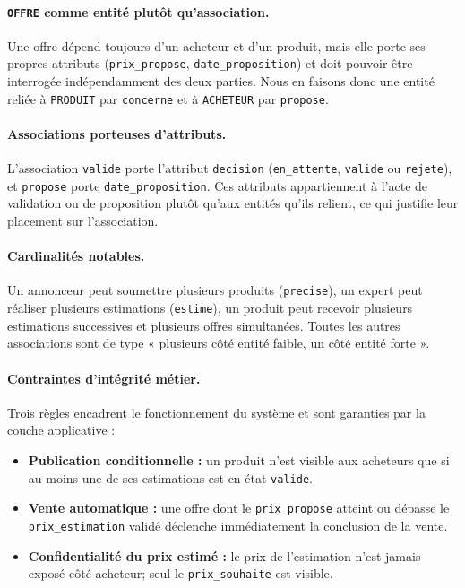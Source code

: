 \documentclass{article}
\theoremstyle{plain}
\theoremstyle{definition}
\begin{document}
\paragraph{\texttt{OFFRE} comme entité plutôt qu'association.}
Une offre dépend toujours d'un acheteur et d'un produit, mais elle porte
ses propres attributs (\texttt{prix\_propose}, \texttt{date\_proposition})
et doit pouvoir être interrogée indépendamment des deux parties. Nous en
faisons donc une entité reliée à \texttt{PRODUIT} par \texttt{concerne} et
à \texttt{ACHETEUR} par \texttt{propose}.
 
\paragraph{Associations porteuses d'attributs.}
L'association \texttt{valide} porte l'attribut \texttt{decision}
(\texttt{en\_attente}, \texttt{valide} ou \texttt{rejete}), et
\texttt{propose} porte \texttt{date\_proposition}. Ces attributs
appartiennent à l'acte de validation ou de proposition plutôt qu'aux
entités qu'ils relient, ce qui justifie leur placement sur l'association.
 
\paragraph{Cardinalités notables.}
Un annonceur peut soumettre plusieurs produits (\texttt{precise}), un
expert peut réaliser plusieurs estimations (\texttt{estime}), un produit
peut recevoir plusieurs estimations successives et plusieurs offres
simultanées. Toutes les autres associations sont de type
« plusieurs côté entité faible, un côté entité forte ».
 
\paragraph{Contraintes d'intégrité métier.}
Trois règles encadrent le fonctionnement du système et sont garanties
par la couche applicative :
\begin{itemize}
    \item \textbf{Publication conditionnelle :} un produit n'est visible
    aux acheteurs que si au moins une de ses estimations est en état
    \texttt{valide}.
    \item \textbf{Vente automatique :} une offre dont le
    \texttt{prix\_propose} atteint ou dépasse le \texttt{prix\_estimation}
    validé déclenche immédiatement la conclusion de la vente.
    \item \textbf{Confidentialité du prix estimé :} le prix de
    l'estimation n'est jamais exposé côté acheteur; seul le
    \texttt{prix\_souhaite} est visible.
\end{itemize}
 
\end{document}
